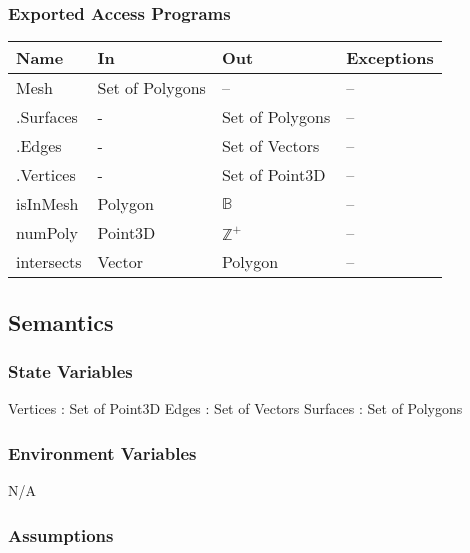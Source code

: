 \documentclass[12pt, titlepage]{article}
\begin{document}
\subsubsection{Exported Access Programs}
\begin{center}
	\begin{tabular}{p{4cm} p{2cm} p{2cm} p{4cm}}
		\hline
		\textbf{Name} & \textbf{In} & \textbf{Out} & \textbf{Exceptions} \\
		\hline
		Mesh & Set of Polygons & -- & -- \\
		.Surfaces & - & Set of Polygons & -- \\
		.Edges & - & Set of Vectors & -- \\
		.Vertices & - & Set of Point3D & -- \\
		isInMesh & Polygon & $\mathbb{B}$ & -- \\ %
		numPoly & Point3D & $\mathbb{Z^+}$ & -- \\ %
		intersects & Vector & Polygon & -- \\ %
		\hline
	\end{tabular}
\end{center}

\subsection{Semantics}
\subsubsection{State Variables}
Vertices : Set of Point3D
Edges : Set of Vectors
Surfaces : Set of Polygons

\subsubsection{Environment Variables}
N/A

\subsubsection{Assumptions}
\end{document}
